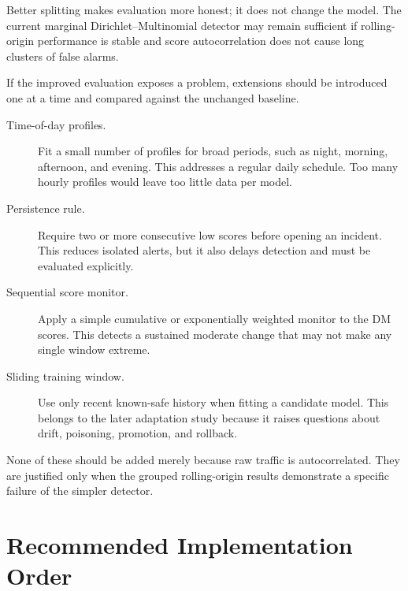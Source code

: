 \documentclass[11pt,a4paper]{article}
\begin{document}
Better splitting makes evaluation more honest; it does not change the model.
The current marginal Dirichlet--Multinomial detector may remain sufficient if
rolling-origin performance is stable and score autocorrelation does not cause
long clusters of false alarms.

If the improved evaluation exposes a problem, extensions should be introduced
one at a time and compared against the unchanged baseline.

\begin{description}

\item[Time-of-day profiles.] Fit a small number of profiles for broad periods,
such as night, morning, afternoon, and evening. This addresses a regular daily
schedule. Too many hourly profiles would leave too little data per model.

\item[Persistence rule.] Require two or more consecutive low scores before
opening an incident. This reduces isolated alerts, but it also delays detection
and must be evaluated explicitly.

\item[Sequential score monitor.] Apply a simple cumulative or exponentially
weighted monitor to the DM scores. This detects a sustained moderate change
that may not make any single window extreme.

\item[Sliding training window.] Use only recent known-safe history when fitting
a candidate model. This belongs to the later adaptation study because it raises
questions about drift, poisoning, promotion, and rollback.

\end{description}

None of these should be added merely because raw traffic is autocorrelated.
They are justified only when the grouped rolling-origin results demonstrate a
specific failure of the simpler detector.

\section{Recommended Implementation Order}
\end{document}
